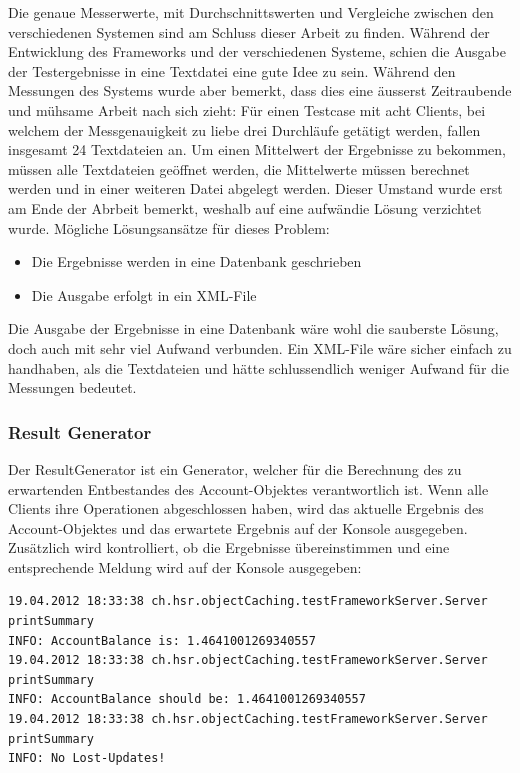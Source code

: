 Die genaue Messerwerte, mit Durch\-schnitts\-wer\-ten und Ver\-gleiche zwischen den verschiedenen Systemen sind am Schluss dieser Arbeit zu finden. \newline
Während der Entwicklung des Frameworks und der verschiedenen Systeme, schien die Ausgabe der Testergebnisse in eine Textdatei eine gute Idee zu sein. Während den Messungen des Systems wurde aber bemerkt, dass dies eine äusserst Zeitraubende und mühsame Arbeit nach sich zieht: Für einen Testcase mit acht Clients, bei welchem der Messgenauigkeit zu liebe drei Durchläufe getätigt werden, fallen insgesamt 24 Textdateien an. Um einen Mittelwert der Ergebnisse zu bekommen, müssen alle Textdateien geöffnet werden, die Mittelwerte müssen berechnet werden und in einer weiteren Datei abgelegt werden. \newline
Dieser Umstand wurde erst am Ende der Abrbeit bemerkt, weshalb auf eine aufwändie Lösung verzichtet wurde. Mögliche Lösungsansätze für dieses Problem:
\begin{itemize}
\item Die Ergebnisse werden in eine Datenbank geschrieben
\item Die Ausgabe erfolgt in ein XML-File
\end{itemize}
Die Ausgabe der Ergebnisse in eine Datenbank wäre wohl die sauberste Lösung, doch auch mit sehr viel Aufwand verbunden. Ein XML-File wäre sicher einfach zu handhaben, als die Textdateien und hätte schlussendlich weniger Aufwand für die Messungen bedeutet.

\subsubsection{Result Generator}
\label{sec:resultGenerator}
Der ResultGenerator ist ein Generator, welcher für die Berechnung des zu erwartenden Entbestandes des Account-Objektes verantwortlich ist. Wenn alle Clients ihre Operationen abgeschlossen haben, wird das aktuelle Ergebnis des Account-Objektes und das erwartete Ergebnis auf der Konsole ausgegeben. Zusätzlich wird kontrolliert, ob die Ergebnisse übereinstimmen und eine entsprechende Meldung wird auf der Konsole ausgegeben:
\begin{lstlisting}[breaklines=true]
19.04.2012 18:33:38 ch.hsr.objectCaching.testFrameworkServer.Server printSummary
INFO: AccountBalance is: 1.4641001269340557
19.04.2012 18:33:38 ch.hsr.objectCaching.testFrameworkServer.Server printSummary
INFO: AccountBalance should be: 1.4641001269340557
19.04.2012 18:33:38 ch.hsr.objectCaching.testFrameworkServer.Server printSummary
INFO: No Lost-Updates!
\end{lstlisting}

